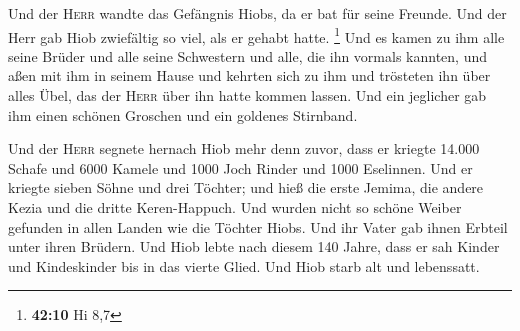  Und der \textsc{Herr} wandte das Gefängnis Hiobs, da er
bat für seine Freunde. Und der Herr gab Hiob zwiefältig so viel, als er
gehabt hatte. \footnote{\textbf{42:10} Hi 8,7}  Und es
kamen zu ihm alle seine Brüder und alle seine Schwestern und alle, die
ihn vormals kannten, und aßen mit ihm in seinem Hause und kehrten sich
zu ihm und trösteten ihn über alles Übel, das der \textsc{Herr} über ihn
hatte kommen lassen. Und ein jeglicher gab ihm einen schönen Groschen
und ein goldenes Stirnband.

 Und der \textsc{Herr} segnete hernach Hiob mehr denn
zuvor, dass er kriegte 14.000 Schafe und 6000 Kamele und 1000 Joch
Rinder und 1000 Eselinnen.  Und er kriegte sieben Söhne
und drei Töchter;  und hieß die erste Jemima, die andere
Kezia und die dritte Keren-Happuch.  Und wurden nicht so
schöne Weiber gefunden in allen Landen wie die Töchter Hiobs. Und ihr
Vater gab ihnen Erbteil unter ihren Brüdern.  Und Hiob
lebte nach diesem 140 Jahre, dass er sah Kinder und Kindeskinder bis in
das vierte Glied.  Und Hiob starb alt und lebenssatt.

